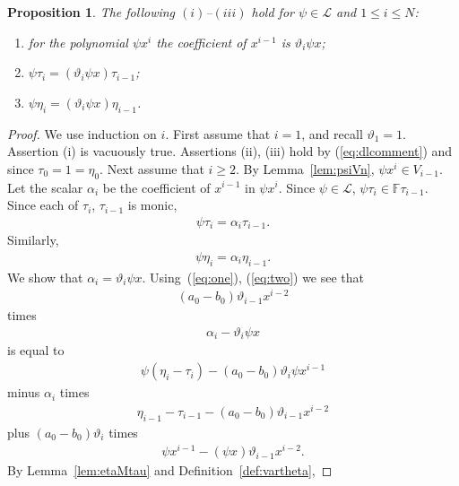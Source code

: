 \documentclass[pdftex]{sigma}
\numberwithin{equation}{section}
\newtheorem{Proposition}[Theorem]{Proposition}
\begin{document}
\begin{Proposition}\label{prop:psiVT}
The following $(i)$--$(iii)$ hold
for $\psi \in \mathcal L$ and $1 \leq i \leq N$:
\begin{enumerate}\itemsep=0pt
\item[$(i)$] for the polynomial $\psi x^i$ the coefficient
of $x^{i-1}$ is $\vartheta_i \psi x$;
\item[$(ii)$] $\psi \tau_i = (\vartheta_i \psi x) \tau_{i-1}$;
\item[$(iii)$] $\psi \eta_i = (\vartheta_i \psi x) \eta_{i-1}$.
\end{enumerate}
\end{Proposition}
\begin{proof} We use induction on $i$. First assume that $i=1$,
and recall $\vartheta_1=1$. Assertion (i) is vacuously true.
Assertions (ii), (iii) hold by
(\ref{eq:dlcomment}) and since $\tau_0=1=\eta_0$.
 Next assume that $i\geq 2$. By Lemma~\ref{lem:psiVn},
 $\psi x^i
\in V_{i-1}$. Let the scalar $\alpha_i$ be the
coefficient of $x^{i-1}$ in $\psi x^i$.
Since $\psi \in \mathcal L$,
$\psi \tau_i \in \mathbb F \tau_{i-1}$. Since each of
$\tau_i$, $\tau_{i-1}$ is monic,
\begin{gather}
\psi \tau_i= \alpha_i \tau_{i-1}.
\label{eq:one}
\end{gather}
Similarly,
\begin{gather}
\psi \eta_i= \alpha_i \eta_{i-1}.
\label{eq:two}
\end{gather}
We show that $\alpha_i = \vartheta_i \psi x$.
Using~(\ref{eq:one}),
(\ref{eq:two}) we see that
\begin{gather}
\label{eq:three}
(a_0 - b_0) \vartheta_{i-1} x^{i-2}
\end{gather}
times
\begin{gather}
\alpha_i - \vartheta_i \psi x
\label{eq:four}
\end{gather}
is equal to
\begin{gather}
\psi(\eta_i - \tau_i) - (a_0 - b_0) \vartheta_i \psi x^{i-1}
\label{eq:five}
\end{gather}
minus $\alpha_i$ times
\begin{gather}
\eta_{i-1} - \tau_{i-1} - (a_0 - b_0) \vartheta_{i-1} x^{i-2}
\label{eq:six}
\end{gather}
plus $(a_0-b_0) \vartheta_i$ times
\begin{gather}
\psi x^{i-1}-(\psi x) \vartheta_{i-1} x^{i-2}.\label{eq:seven}
\end{gather}
By Lemma~\ref{lem:etaMtau} and Definition~\ref{def:vartheta},

\end{proof}
\end{document}
